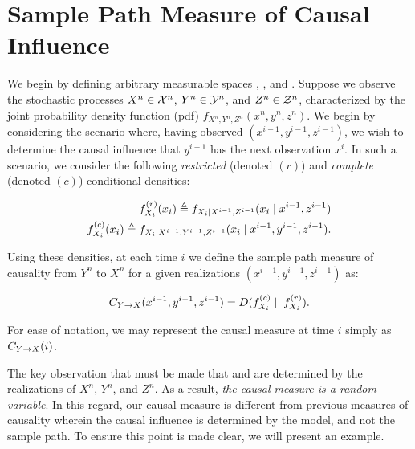 \section{Sample Path Measure of Causal Influence} \label{measure}
\begin{comment}
- Definition
- True causal measure is random
- Can be applied to time varying settings
- Always non-negative
- Is always well defined (as opposed to directed information rate)
- ``Semi-local'' - Measure such as DI and TE are functions of the model (can't capture local influence), but local measures like pointwise mutual information can be negative. Our measure is local and positive.
\end{comment}

We begin by defining arbitrary measurable spaces , , and . Suppose we observe the stochastic processes $X^n \in \mathcal{X}^n$, $Y^n \in \mathcal{Y}^n$, and $Z^n \in \mathcal{Z}^n$, characterized by the joint probability density function (pdf) $f_{X^n,Y^n,Z^n}(x^n,y^n,z^n)$. We begin by considering the scenario where, having observed $(x^{i-1},y^{i-1},z^{i-1})$, we wish to determine the causal influence that $y^{i-1}$ has the next observation $x^i$. In such a scenario, we consider the following \emph{restricted} (denoted $(r)$) and \emph{complete} (denoted $(c)$) conditional densities:

\begin{eqnarray}
f_{X_i}^{(r)}(x_i) \triangleq f_{X_i \mid X^{i-1},Z^{i-1}}
    (x_i \mid x^{i-1},z^{i-1}) \\
f_{X_i}^{(c)}(x_i) \triangleq f_{X_i \mid X^{i-1},Y^{i-1},Z^{i-1}}
    (x_i \mid x^{i-1},y^{i-1},z^{i-1}).
\end{eqnarray}

\noindent Using these densities, at each time $i$ we define the sample path measure of causality from $Y^n$ to $X^n$ for a given realizations $(x^{i-1},y^{i-1},z^{i-1})$ as:

\begin{equation}
C_{Y\rightarrow X}(x^{i-1},y^{i-1},z^{i-1}) = D(f_{X_i}^{(c)} \mid \mid f_{X_i}^{(r)}).
\end{equation}

\noindent For ease of notation, we may represent the causal measure at time $i$ simply as $C_{Y\rightarrow X}(i)$.

The key observation that must be made that  and  are determined by the realizations of $X^n$, $Y^n$, and $Z^n$. As a result, \emph{the causal measure is a random variable}. In this regard, our causal measure is different from previous measures of causality wherein the causal influence is determined by the model, and not the sample path. To ensure this point is made clear, we will present an example.

